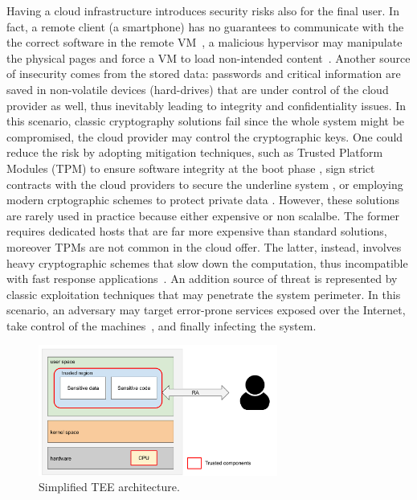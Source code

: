 Having a cloud infrastructure introduces security risks also for the final 
user. In fact, a remote client (\eg a smartphone) has no guarantees to 
communicate with the the correct software in the remote 
VM~\citep{beekman2016attestation}, \eg a malicious hypervisor may manipulate 
the physical pages and force a VM to load non-intended 
content~\citep{10.1145/3292006.3300022}.
Another source of insecurity comes from the stored data: passwords and critical 
information are saved in non-volatile devices (\ie hard-drives) that are under 
control of the cloud provider as well, thus inevitably leading to integrity and 
confidentiality issues.
In this scenario, classic cryptography solutions fail since the whole system 
might be compromised, \ie the cloud provider may control the cryptographic keys.
%
One could reduce the risk by adopting mitigation techniques, such as 
Trusted Platform Modules (TPM) to ensure software integrity at the boot phase 
\citep{tpm-isoosi}, sign strict contracts with the cloud providers to secure 
the underline system \citep{aws_dedicated_host}, or employing modern 
crptographic schemes to protect private data \citep{gentry2009fully}.
%
However, these solutions are rarely used in practice because either expensive 
or non scalalbe. The former requires dedicated hosts that are far more 
expensive than standard solutions, moreover TPMs are not common in the cloud 
offer. 
The latter, instead, involves heavy cryptographic schemes that slow down the 
computation, thus incompatible with fast response 
applications~\citep{10.1145/2046660.2046682}.
%
An addition source of threat is represented by classic exploitation techniques 
that may penetrate the system perimeter.
In this scenario, an adversary may target error-prone services exposed over the 
Internet, take control of the
machines~\citep{van2012memory,10.1145/2810103.2813646}, and finally infecting 
the system.


\begin{figure}[t]
	\centering
	\includegraphics[width=0.7\textwidth]{fig_c1/sgx-architecture.pdf}
	\caption[SGX architecture.]{Simplified TEE architecture.}
	\label{fig:sgx-architecture}
\end{figure}

